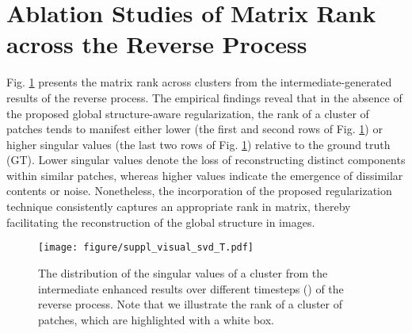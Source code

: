 \documentclass{article}
\begin{document}
\section{Ablation Studies of Matrix Rank across the Reverse Process}

Fig. \ref{fig:visual-svd-t} presents the matrix rank across clusters from the intermediate-generated results of the reverse process. The empirical findings reveal that in the absence of the proposed global structure-aware regularization, the rank of a cluster of patches tends to manifest either lower (the first and second rows of Fig. \ref{fig:visual-svd-t}) or higher singular values (the last two rows of Fig. \ref{fig:visual-svd-t}) relative to the ground truth (GT). Lower singular values denote the loss of reconstructing distinct components within similar patches, whereas higher values indicate the emergence of dissimilar contents or noise. Nonetheless, the incorporation of the proposed regularization technique consistently captures an appropriate rank in matrix, thereby facilitating the reconstruction of the global structure in images.

\begin{figure}[h]
\centering
\texttt{[image: figure/suppl\_visual\_svd\_T.pdf]}\vspace{-0.4cm}
\caption{The distribution of the singular values of a cluster from the intermediate enhanced results over different timesteps () of the reverse process. Note that we illustrate the rank of a cluster of patches, which are highlighted with a white box.}
\label{fig:visual-svd-t}
\end{figure}
\small
{}
\end{document}
